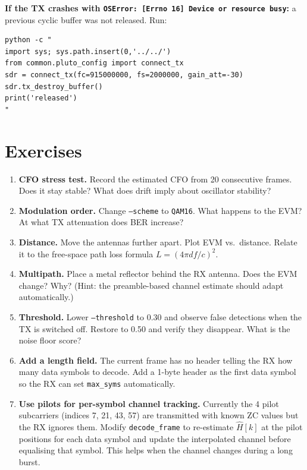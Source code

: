 \documentclass[11pt,a4paper]{article}
\begin{document}
\textbf{If the TX crashes with \texttt{OSError: [Errno 16] Device or resource busy}:}
a previous cyclic buffer was not released.  Run:
\begin{lstlisting}
python -c "
import sys; sys.path.insert(0,'../../')
from common.pluto_config import connect_tx
sdr = connect_tx(fc=915000000, fs=2000000, gain_att=-30)
sdr.tx_destroy_buffer()
print('released')
"
\end{lstlisting}

\section{Exercises}

\begin{enumerate}
  \item \textbf{CFO stress test.}  Record the estimated CFO from 20 consecutive
    frames.  Does it stay stable?  What does drift imply about oscillator
    stability?

  \item \textbf{Modulation order.}  Change \texttt{--scheme} to \texttt{QAM16}.
    What happens to the EVM?  At what TX attenuation does BER increase?

  \item \textbf{Distance.}  Move the antennas further apart.  Plot EVM
    vs.\ distance.  Relate it to the free-space path loss formula
    $L = (4\pi d f / c)^2$.

  \item \textbf{Multipath.}  Place a metal reflector behind the RX antenna.
    Does the EVM change?  Why?  (Hint: the preamble-based channel estimate
    should adapt automatically.)

  \item \textbf{Threshold.}  Lower \texttt{--threshold} to 0.30 and observe
    false detections when the TX is switched off.  Restore to 0.50 and verify
    they disappear.  What is the noise floor score?

  \item \textbf{Add a length field.}  The current frame has no header telling
    the RX how many data symbols to decode.  Add a 1-byte header as the first
    data symbol so the RX can set \texttt{max\_syms} automatically.

  \item \textbf{Use pilots for per-symbol channel tracking.}
    Currently the 4 pilot subcarriers (indices 7, 21, 43, 57) are transmitted
    with known ZC values but the RX ignores them.  Modify \texttt{decode\_frame}
    to re-estimate $\hat{H}[k]$ at the pilot positions for each data symbol and
    update the interpolated channel before equalising that symbol.  This helps
    when the channel changes during a long burst.
\end{enumerate}
\end{document}
